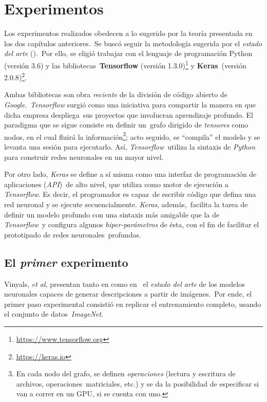 \section{Experimentos}

\noindent
Los experimentos realizados obedecen a lo sugerido por la teoría presentada en los dos capítulos anteriores.\
Se buscó seguir la metodología sugerida por el \emph{estado del arte} (\cite{DBLP:journals/corr/VinyalsTBE16}).\
Por ello, se eligió trabajar con el lenguaje de programación Python (versión 3.6) y las bibliotecas\
\textbf{Tensorflow} (versión 1.3.0)\footnote{\url{https://www.tensorflow.org}} y \textbf{Keras}\
(versión 2.0.8)\footnote{\url{https://keras.io}}.\par
Ambas bibliotecas son obra \emph{reciente} de la división de código abierto de \emph{Google}.\
\emph{Tensorflow} surgió como una iniciativa para compartir la manera en que dicha empresa despliega\
sus proyectos que involucran aprendizaje profundo. El paradigma que se sigue consiste en definir un\
grafo dirigido de \emph{tensores} como nodos, en el cual fluirá la información\footnote{
  En cada nodo del grafo, se definen \emph{operaciones} (lectura y escritura de archivos, operaciones\
  matriciales, etc.) y se da la posibilidad de especificar si van a correr en un GPU, si se cuenta con uno.
}; acto seguido, se ``compila'' el modelo y se levanta una sesión para ejecutarlo. Así, \emph{Tensorflow}\
utiliza la sintaxis de \emph{Python} para construir redes neuronales en un mayor nivel.\par
Por otro lado, \emph{Keras} se define a sí misma como una interfaz de programación de aplicaciones (\emph{API})\
de alto nivel, que utiliza como motor de ejecución a \emph{Tensorflow}. Es decir, el programador es capaz\
de escribir código que defina una red neuronal y se ejecute secuencialmente. \emph{Keras}, además,\
facilita la tarea de definir un modelo profundo con una sintaxis más amigable que la de \emph{Tensorflow}\
y configura algunos \emph{hiper-parámetros} de ésta, con el fin de facilitar el prototipado de redes neuronales\
profundas.

\subsection{El \emph{primer} experimento}

\noindent
Vinyals, \emph{et al}, presentan tanto en \cite{DBLP:journals/corr/VinyalsTBE14} como en \cite{DBLP:journals/corr/VinyalsTBE16}\
el \emph{estado del arte} de los modelos neuronales capaces de generar descripciones a partir de imágenes.\
Por ende, el primer paso experimental consistió en replicar el entrenamiento completo, usando el conjunto de datos\
\emph{ImageNet}.

